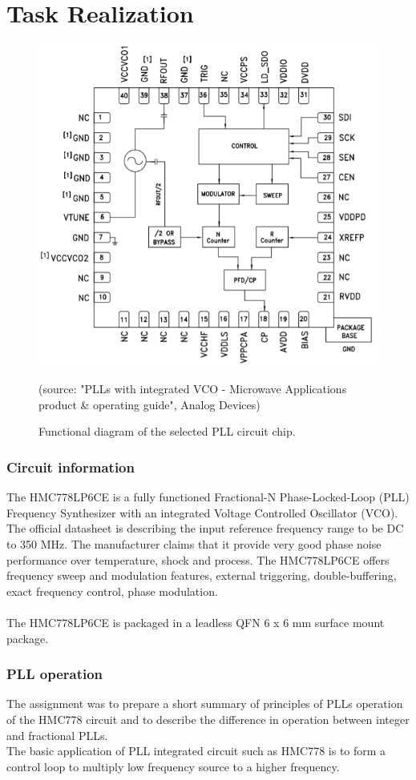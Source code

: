 \documentclass[eng,printmode]{mgr}
\begin{document}
\section{Task Realization}
\begin{figure}[!h]
	\centering
	\includegraphics[width=0.5\linewidth]{pll}
	\label{fig:pll}
	\caption{Functional diagram of the selected PLL circuit chip.}
	
	(source: "PLLs with integrated VCO - Microwave Applications
	product \& operating guide", Analog Devices)
\end{figure}
\noindent
\subsubsection{Circuit information}
The HMC778LP6CE is a fully functioned Fractional-N Phase-Locked-Loop (PLL) Frequency Synthesizer with an
integrated Voltage Controlled Oscillator (VCO). \\
The official datasheet is describing the input reference frequency range to be DC to 350 MHz. The manufacturer claims that it provide very good phase noise performance over temperature,
shock and process. The HMC778LP6CE offers frequency sweep and modulation features, external triggering, double-buffering, exact frequency control, phase modulation.\\ \\ The HMC778LP6CE is packaged
in a leadless QFN 6 x 6 mm surface mount package.

\subsubsection{PLL operation}
The assignment was to prepare a short summary of principles of PLLs operation of the HMC778 circuit and to describe the difference in operation between integer and fractional PLLs.
\\
The basic application of PLL integrated circuit such as HMC778 is to form a control loop to multiply low frequency source to a higher frequency.
\end{document}
